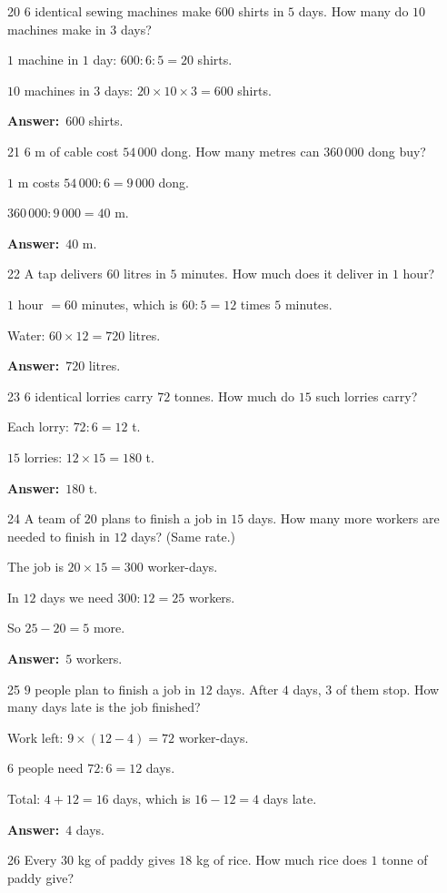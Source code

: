 \documentclass[11pt]{article}
\newif\ifsol \solfalse
\providecommand{\AnsWord}{Đáp số}
\newcommand{\dapso}[1]{\par\textbf{\AnsWord:}\ #1}
\newcommand{\probsol}[1]{%
  \begin{lrbox}{\solmeasure}\begin{minipage}{\dimexpr\linewidth-24pt\relax}#1\end{minipage}\end{lrbox}%
  \ifsol
    \begin{solbox}#1\end{solbox}%
  \else
    \setlength{\solht}{\dimexpr\ht\solmeasure+\dp\solmeasure+0.85cm\relax}%
    \ifdim\solht<1.35cm\setlength{\solht}{1.35cm}\fi
    \begin{tcolorbox}[colback=white,colframe=Line,boxrule=0.8pt,arc=5pt,
      left=8pt,right=8pt,top=4pt,bottom=4pt,height=\solht]{\footnotesize\color{Slate}\itshape\WorkWord}\end{tcolorbox}%
  \fi}
\newcommand{\gap}{\vspace{0.3cm}}
\def\WorkWord{Your work:}
\def\AnsWord{Answer}
\begin{document}
\gap
\begin{probbox}{20}{\relax}
$6$ identical sewing machines make $600$ shirts in $5$ days. How many do $10$ machines make in $3$ days?
\end{probbox}
\probsol{
$1$ machine in $1$ day: $600:6:5=20$ shirts.\par $10$ machines in $3$ days: $20\times10\times3=600$ shirts.
\dapso{$600$ shirts.}}
\gap
\begin{probbox}{21}{\relax}
$6$ m of cable cost $54\,000$ dong. How many metres can $360\,000$ dong buy?
\end{probbox}
\probsol{
$1$ m costs $54\,000:6=9\,000$ dong.\par $360\,000:9\,000=40$ m.
\dapso{$40$ m.}}
\gap
\begin{probbox}{22}{\relax}
A tap delivers $60$ litres in $5$ minutes. How much does it deliver in $1$ hour?
\end{probbox}
\probsol{
$1$ hour $=60$ minutes, which is $60:5=12$ times $5$ minutes.\par Water: $60\times12=720$ litres.
\dapso{$720$ litres.}}
\gap
\begin{probbox}{23}{\relax}
$6$ identical lorries carry $72$ tonnes. How much do $15$ such lorries carry?
\end{probbox}
\probsol{
Each lorry: $72:6=12$ t.\par $15$ lorries: $12\times15=180$ t.
\dapso{$180$ t.}}
\gap
\begin{probbox}{24}{\relax}
A team of $20$ plans to finish a job in $15$ days. How many more workers are needed to finish in $12$ days? (Same rate.)
\end{probbox}
\probsol{
The job is $20\times15=300$ worker-days.\par In $12$ days we need $300:12=25$ workers.\par So $25-20=5$ more.
\dapso{$5$ workers.}}
\gap
\begin{probbox}{25}{\relax}
$9$ people plan to finish a job in $12$ days. After $4$ days, $3$ of them stop. How many days late is the job finished?
\end{probbox}
\probsol{
Work left: $9\times(12-4)=72$ worker-days.\par $6$ people need $72:6=12$ days.\par Total: $4+12=16$ days, which is $16-12=4$ days late.
\dapso{$4$ days.}}
\gap
\begin{probbox}{26}{\relax}
Every $30$ kg of paddy gives $18$ kg of rice. How much rice does $1$ tonne of paddy give?
\end{probbox}
\end{document}

